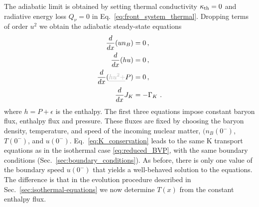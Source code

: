\documentclass[10pt,superscriptaddress,
amsmath,aps,prc,twocolumn,nofootinbib,floatfix]{revtex4-1}
\newcommand{\mga}[1]{{\color[rgb]{0.6,0,0}#1}}
\newcommand{\old}[1]{{\color[rgb]{0.7,0.7,0.7}\sout{#1}}}
\newcommand{\eps}{\epsilon}
\begin{document}
\mga{The adiabatic limit is obtained by}
setting thermal conductivity $\kappa_{\rm th}=0$ and radiative energy loss $Q_\nu=0$ in Eq.~\eqref{eq:front_system_thermal}.
\mga{Dropping terms of order $u^2$ we obtain} the adiabatic steady-state  equations
%
\begin{subequations}\label{eq:front_system_adiabatic}
\begin{align}
\frac{d}{dx}(u n_B)&= 0\,,
\label{eq:baryon_conservation}\\
\frac{d}{dx}(h u) &=0\,,
\label{eq:energy_conservation}\\
 \frac{d}{dx}(\old{h u^2+}P)&=0\,,
 \label{eq:momentum_conservation}\\
 \frac{d}{dx}J_K &= -\Gamma_K\ .
    \label{eq:K_conservation}
\end{align}
\end{subequations}
%
where $h=P+\eps$ is the enthalpy.
The first three equations impose constant baryon flux, enthalpy flux and pressure.
These fluxes are fixed by choosing the baryon density, temperature, and speed of the incoming nuclear matter, $(n_B(0^-)$, $T(0^-)$, and $u(0^-)$.  Eq.~\eqref{eq:K_conservation} leads to the same K transport equations as in the isothermal case \eqref{eq:reduced_BVP}, with the same boundary conditions  (Sec.~\ref{sec:boundary_conditions}). As before, there is only one value of the boundary speed $u(0^-)$ that yields a well-behaved solution to the equations.
The difference is that in the evolution procedure described in Sec.~\ref{sec:isothermal-equations} we now determine $T(x)$ from the constant enthalpy flux. 
\end{document}
